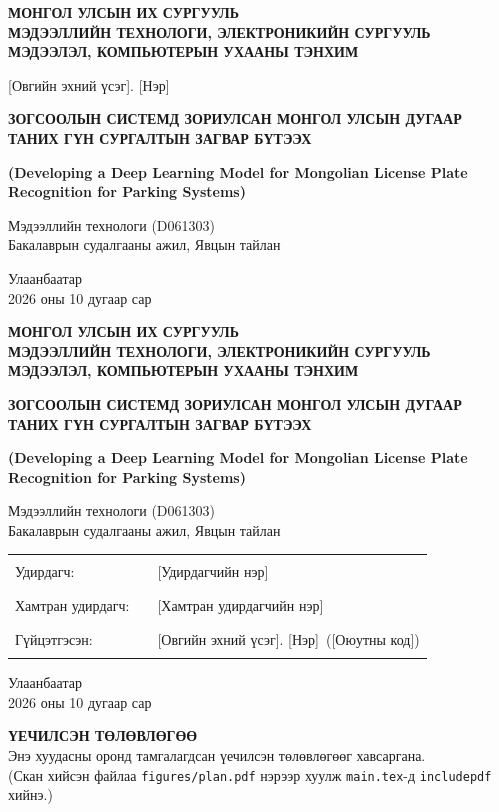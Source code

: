 \documentclass[12pt,a4paper,oneside]{report}
\newcommand{\univ}{МОНГОЛ УЛСЫН ИХ СУРГУУЛЬ}
\newcommand{\school}{МЭДЭЭЛЛИЙН ТЕХНОЛОГИ, ЭЛЕКТРОНИКИЙН СУРГУУЛЬ}
\newcommand{\dept}{МЭДЭЭЛЭЛ, КОМПЬЮТЕРЫН УХААНЫ ТЭНХИМ}
\newcommand{\studentname}{[Овгийн эхний үсэг]. [Нэр]}
\newcommand{\studentid}{[Оюутны код]}
\newcommand{\supervisor}{[Удирдагчийн нэр]}
\newcommand{\cosupervisor}{[Хамтран удирдагчийн нэр]}
\newcommand{\program}{Мэдээллийн технологи (D061303)}
\newcommand{\reporttype}{Бакалаврын судалгааны ажил, Явцын тайлан}
\newcommand{\titlemn}{ЗОГСООЛЫН СИСТЕМД ЗОРИУЛСАН МОНГОЛ УЛСЫН ДУГААР ТАНИХ ГҮН СУРГАЛТЫН ЗАГВАР БҮТЭЭХ}
\newcommand{\titleen}{(Developing a Deep Learning Model for Mongolian License Plate Recognition for Parking Systems)}
\newcommand{\reportdate}{2026 оны 10 дугаар сар}
\begin{document}
\begin{titlepage}\centering
{\bfseries\small \univ\\ \school\\ \dept\par}
\vspace{3.5cm}
{\large \studentname\par}
\vspace{3cm}
{\bfseries\Large \titlemn\par}\vspace{0.4cm}
{\bfseries\large \titleen\par}\vspace{0.8cm}
{\program\\ \reporttype\par}
\vfill
{Улаанбаатар\\[0.4cm] \reportdate\par}
\end{titlepage}
\begin{titlepage}\centering
{\bfseries\small \univ\\ \school\\ \dept\par}
\vspace{5cm}
{\bfseries\Large \titlemn\par}\vspace{0.4cm}
{\bfseries\large \titleen\par}\vspace{0.8cm}
{\program\\ \reporttype\par}
\vspace{3cm}
\begin{tabular}{p{3.8cm}p{4.3cm}p{6.5cm}}
Удирдагч: & \rule{4cm}{0.4pt} & \supervisor\\[0.6cm]
Хамтран удирдагч: & \rule{4cm}{0.4pt} & \cosupervisor\\[0.6cm]
Гүйцэтгэсэн: & \rule{4cm}{0.4pt} & \studentname\ (\studentid)\\
\end{tabular}
\vfill
{Улаанбаатар\\[0.4cm] \reportdate\par}
\end{titlepage}
\thispagestyle{empty}\vspace*{\fill}\begin{center}{\bfseries\Large ҮЕЧИЛСЭН ТӨЛӨВЛӨГӨӨ}\\[1em]
Энэ хуудасны оронд тамгалагдсан үечилсэн төлөвлөгөөг хавсаргана.\\(Скан хийсэн файлаа \texttt{figures/plan.pdf} нэрээр хуулж \texttt{main.tex}-д \texttt{includepdf} хийнэ.)\end{center}\vspace*{\fill}\clearpage
\setcounter{page}{2}
\end{document}
